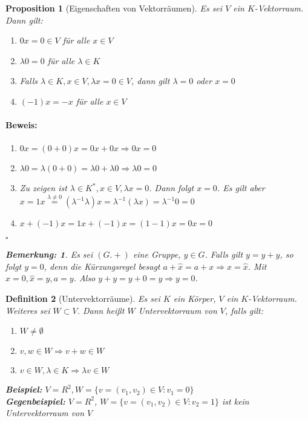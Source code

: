 \documentclass{report}
\newcommand{\IN}[1]{\index{#1|BH}}
\newcommand{\lb}{\lambda}
\theoremstyle{customrem}
\newtheorem*{bem}{Bemerkung:}
\theoremstyle{customdef}
\newtheorem{definition}{Definition}[chapter]
\newtheorem{proposition}[definition]{Proposition}
\renewenvironment{proof}{\vspace{-.75cm}\paragraph{Beweis: }}{\vspace{-.5cm}\hfill$\square$}
\begin{document}
	\begin{proposition}[Eigenschaften von Vektorräumen]
		Es sei $V$ ein $K$-Vektorraum. Dann gilt:
		\begin{enumerate}[leftmargin=4cm]
			\itemsep0cm
			\item $0 x = 0 \in V$ für alle $x \in V$
			\item $\lb 0 = 0$ für alle $\lb \in K$
			\item Falls $\lb \in K, x \in V, \lb x = 0 \in V$, dann gilt $\lb = 0$ oder $x = 0$
			\item $(-1) x = -x$ für alle $x \in V$
		\end{enumerate}
		\begin{proof}
			\begin{enumerate}
				\itemsep0cm
				\item $0 x = (0 + 0)x = 0x + 0x \Rightarrow 0x = 0$
				\item $\lb 0 = \lb(0 + 0) = \lb 0 + \lb 0 \Rightarrow \lb 0 = 0$
				\item Zu zeigen ist $\lb \in K^\ast, x \in V, \lb x = 0$. Dann folgt $x = 0$. Es gilt aber $x = 1 x \overset{\lb \neq 0}{=} (\lb ^{-1} \lb) x = \lb^{-1}(\lb x) = \lb^{-1} 0 = 0$
				\item $x + (-1) x = 1x + (-1) x = (1 - 1)  x = 0 x = 0$
			\end{enumerate}
		\end{proof}
		\begin{bem}
			Es sei $(G. +)$ eine Gruppe, $y \in G$. Falls gilt $y = y + y$, so folgt $y = 0$, denn die Kürzungsregel besagt $a + \hat{x} = a+x \Rightarrow x = \hat{x}$. Mit $x = 0, \hat{x} = y, a = y$. Also $y +y = y + 0 = y \Rightarrow y = 0$.
		\end{bem}
	\end{proposition}

	\begin{definition}[Untervektorräume]
		\IN{Vektorraum!Unter-}
		Es sei $K$ ein Körper, $V$ ein $K$-Vektorraum. Weiteres sei $W \subset V$. Dann heißt $W$ Untervektorraum von $V$, falls gilt:
		
		\begin{enumerate}[leftmargin=4cm]
			\itemsep0cm
			\item $W \neq \emptyset$ 
			\item $v, w \in W \Rightarrow v + w \in W$
			\item $v \in W, \lb \in K \Rightarrow \lb v \in W$
		\end{enumerate}
		
		\noindent\textbf{Beispiel:}
		$V = R^2, W = \{v = (v_1, v_2) \in V : v_1 = 0\}$\\
		\textbf{Gegenbeispiel:}
		$V = R^2$, $W = \{v = (v_1, v_2) \in V : v_2 = 1\}$ ist kein Untervektorraum von $V$
	\end{definition}
	
\end{document}
